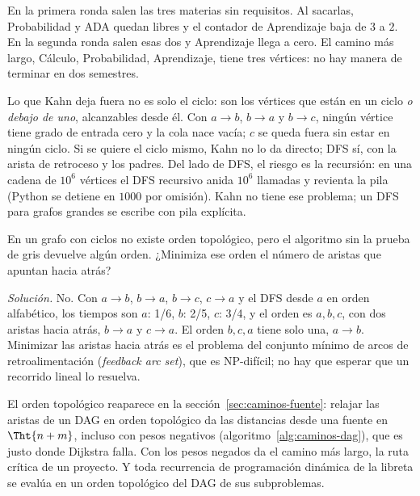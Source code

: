 \documentclass[11pt,letterpaper]{article}
\begin{document}
En la primera ronda salen las tres materias sin requisitos. Al
sacarlas, Probabilidad y ADA quedan libres y el contador de
Aprendizaje baja de $3$ a $2$. En la segunda ronda salen esas dos y
Aprendizaje llega a cero. El camino más largo, Cálculo, Probabilidad,
Aprendizaje, tiene tres vértices: no hay manera de terminar en dos
semestres.

\begin{ojo}
  Lo que Kahn deja fuera no es solo el ciclo: son los vértices que
  están en un ciclo \emph{o debajo de uno}, alcanzables desde él. Con
  $a \to b$, $b \to a$ y $b \to c$, ningún vértice tiene grado de
  entrada cero y la cola nace vacía; $c$ se queda fuera sin estar en
  ningún ciclo. Si se quiere el ciclo mismo, Kahn no lo da directo; DFS
  sí, con la arista de retroceso y los padres. Del lado de DFS, el
  riesgo es la recursión: en una cadena de $10^6$ vértices el DFS
  recursivo anida $10^6$ llamadas y revienta la pila (Python se detiene
  en $1000$ por omisión). Kahn no tiene ese problema; un DFS para
  grafos grandes se escribe con pila explícita.
\end{ojo}

\begin{ejercicio}
  En un grafo con ciclos no existe orden topológico, pero el algoritmo
  sin la prueba de gris devuelve algún orden. ¿Minimiza ese orden el
  número de aristas que apuntan hacia atrás?

  \textit{Solución.} No. Con $a \to b$, $b \to a$, $b \to c$,
  $c \to a$ y el DFS desde $a$ en orden alfabético, los tiempos son
  $a$: 1/6, $b$: 2/5, $c$: 3/4, y el orden es $a, b, c$, con dos
  aristas hacia atrás, $b \to a$ y $c \to a$. El orden $b, c, a$ tiene
  solo una, $a \to b$. Minimizar las aristas hacia atrás es el problema
  del conjunto mínimo de arcos de retroalimentación (\textit{feedback
  arc set}), que es NP-difícil; no hay que esperar que un recorrido
  lineal lo resuelva.
\end{ejercicio}

\begin{observacion}
  El orden topológico reaparece en la sección~\ref{sec:caminos-fuente}:
  relajar las aristas de un DAG en orden topológico da las distancias
  desde una fuente en $\Tht{n + m}$, incluso con pesos negativos
  (algoritmo~\ref{alg:caminos-dag}), que es justo donde Dijkstra falla.
  Con los pesos negados da el camino más largo, la ruta crítica de un
  proyecto. Y toda recurrencia de programación dinámica de la libreta
  se evalúa en un orden topológico del DAG de sus subproblemas.
\end{observacion}
\end{document}
